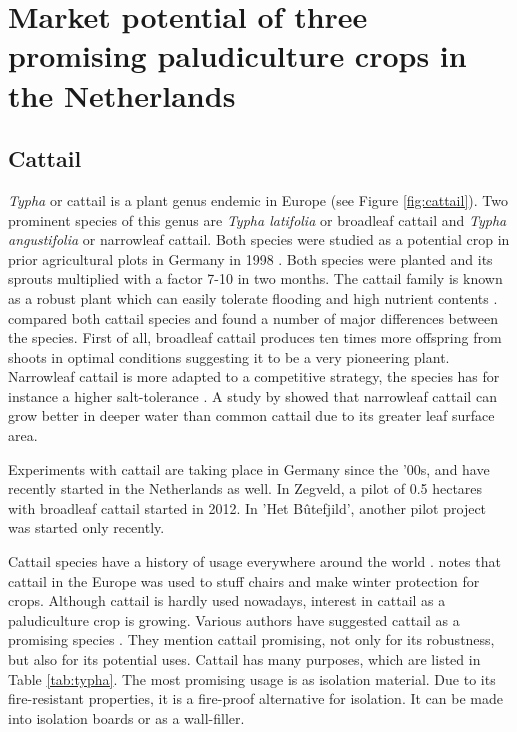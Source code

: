 {\section{Market potential of three promising paludiculture crops in the Netherlands}

\subsection{Cattail}


\textit{Typha} or cattail is a plant genus endemic in Europe (see Figure \ref{fig:cattail}). Two prominent species of this genus are \textit{Typha latifolia} or broadleaf cattail and \textit{Typha angustifolia} or narrowleaf cattail. Both species were studied as a potential crop in prior agricultural plots in Germany in 1998 \citep{wild2001cultivation}. Both species were planted and its sprouts multiplied with a factor 7-10 in two months. The cattail family is known as a robust plant which can easily tolerate flooding and high nutrient contents \citep{wild2001cultivation}. \citet{heinz2011population} compared both cattail species and found a number of major differences between the species. First of all, broadleaf cattail produces ten times more offspring from shoots in optimal conditions suggesting it to be a very pioneering plant. Narrowleaf cattail is more adapted to a competitive strategy, the species has for instance a higher salt-tolerance \citep{heinz2011population}. A study by \citet{grace1982niche} showed that narrowleaf cattail can grow better in deeper water than common cattail due to its greater leaf surface area.

Experiments with cattail are taking place in Germany since the '00s, and have recently started in the Netherlands as well. In Zegveld, a pilot of 0.5 hectares with broadleaf cattail started in 2012. In 'Het B\^utefjild', another pilot project was started only recently. 

Cattail species have a history of usage everywhere around the world \citep{morton1975cattails}. \citet{morton1975cattails} notes that cattail in the Europe was used to stuff chairs and make winter protection for crops. Although cattail is hardly used nowadays, interest in cattail as a paludiculture crop is growing. Various authors have suggested cattail as a promising species \citep{morton1975cattails, heinz2011population}. They mention cattail promising, not only for its robustness, but also for its potential uses. Cattail has many purposes, which are listed in Table \ref{tab:typha}. The most promising usage is as isolation material. Due to its fire-resistant properties, it is a fire-proof alternative for isolation. It can be made into isolation boards or as a wall-filler. 

}
